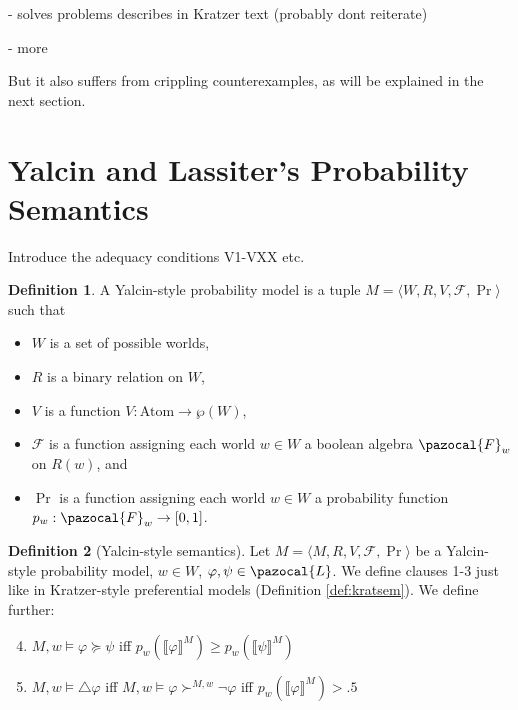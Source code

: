 \documentclass{article}
\theoremstyle{definition}
\newtheorem{definition}{Definition}
\renewcommand{\L}{\pazocal{L}}
\renewcommand{\F}{\pazocal{F}}
\newcommand{\lb}{\llbracket}
\newcommand{\rb}{\rrbracket}
\begin{document}
- solves problems describes in Kratzer text (probably dont reiterate)  

- more

But it also suffers from crippling counterexamples, as will be explained in the next section.

\section{Yalcin and Lassiter's Probability Semantics}
Introduce the adequacy conditions V1-VXX etc.



\begin{definition}
    A Yalcin-style probability model is a tuple $M = \langle W,R,V,\mathcal{F},\Pr\rangle$ such that
    \begin{itemize}[nosep]
        \renewcommand\labelitemi{--}
      \item $W$ is a  set of possible worlds,
      \item $R$ is a binary relation on $W$,
        \item $V$ is a function $V: \text{Atom} \rightarrow \wp(W)$,
        \item $\mathcal{F}$ is a function assigning each world $w \in W$ a boolean algebra $\F_w$ on $R(w)$, and 
          \item $\Pr$ is a function assigning each world $w \in W$ a probability function \\ $p_w: \F_w \rightarrow [0,1]$.
    \end{itemize}
\end{definition}

\begin{definition}[Yalcin-style semantics]
    \label{def:yalcsem}
    Let $M = \langle M,R,V,\mathcal{F},\Pr \rangle$ be a Yalcin-style probability model, $w \in W$, $\varphi, \psi \in \L$. We define clauses 1-3 just like in Kratzer-style preferential models (Definition \ref{def:kratsem}). We define further:
    \begin{enumerate}[nosep]
  \setcounter{enumi}{3}
      \item $M,w \models \varphi \succeq \psi$ iff $p_w(\lb \varphi \rb^M) \geq p_w(\lb \psi \rb^M) $
      \item $M,w \models \triangle \varphi$ iff $M,w \models \varphi \succ^{M,w} \neg \varphi$ iff $ p_w(\lb \varphi \rb^M) > .5$
    \end{enumerate}
\end{definition}
\end{document}
